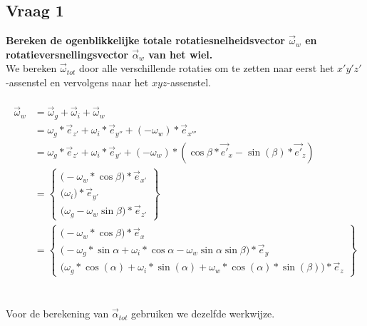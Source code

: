 \documentclass[a4paper,10pt]{article}
\begin{document}
\subsection{Vraag 1}
\textbf{Bereken de ogenblikkelijke totale rotatiesnelheidsvector $\vec{\omega}_{w}$ en rotatieversnellingsvector $\vec{\alpha}_{w}$ van het wiel.}\\
We bereken $\vec{\omega}_{tot}$ door alle verschillende rotaties om te zetten naar eerst het $x'y'z'$-assenstel en vervolgens naar het $xyz$-assenstel.\\
\\
\begin{equation} 
\begin{aligned}
	\vec{\omega}_{w} &= \vec{\omega}_{g} + \vec{\omega}_{i} + \vec{\omega}_{w} \\
	& = {\omega}_g * \vec{e}_{z'} + {\omega}_i * \vec{e}_{y''} +(-{\omega}_w)*\vec{e}_{x'''}\\
	& =  {\omega}_g * \vec{e}_{z'} + {\omega}_i * \vec{e}_{y'} +(-{\omega}_w)*(\cos{\beta}*\vec{e'}_{x}-\sin(\beta)*\vec{e'}_{z})\\
	&=\begin{Bmatrix}
	\Big(-\omega_w*\cos{\beta}\Big)*\vec{e}_{x'} \\
	\Big(\omega_i\Big)*\vec{e}_{y'}\\
	\Big(\omega_g-\omega_w \sin{\beta}\Big)*\vec{e}_{z'}
	\end{Bmatrix}\\
	& = \begin{Bmatrix}
	\Big(- {\omega}_{w} * \cos{\beta}\Big)*\vec{e}_x \\
	\Big(- {\omega}_{g} * \sin{\alpha} + {\omega}_{i} * \cos{\alpha} - {\omega}_{w} \sin{\alpha} \sin{\beta} \Big) *\vec{e}_y \\
	\Big({\omega}_{g} * \cos(\alpha) + {\omega}_{i} * \sin(\alpha) + {\omega}_{w} * \cos(\alpha)*\sin(\beta)\Big) *\vec{e}_z
	\end{Bmatrix} 
\end{aligned}
\end{equation}\\
\\
Voor de berekening van $\vec{\alpha}_{tot}$ gebruiken we dezelfde werkwijze.\\
\\
\end{document}
